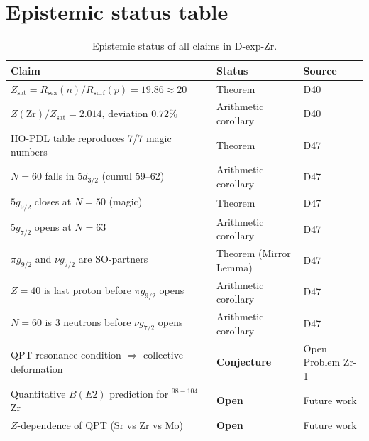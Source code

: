 \documentclass[11pt,a4paper]{article}
\theoremstyle{definition}
\theoremstyle{remark}
\newcommand{\Rsurf}{R_{\mathrm{surf}}}
\newcommand{\Rsea}{R_{\mathrm{sea}}}
\newcommand{\Zsat}{Z_{\mathrm{sat}}}
\begin{document}
\section{Epistemic status table}
\label{app:epistemic}

\begin{table}[H]
\centering
\caption{Epistemic status of all claims in D-exp-Zr.}
\label{tab:epistemic}
\small
\begin{tabular}{p{8cm}p{4cm}p{2cm}}
\toprule
Claim & Status & Source \\
\midrule
$\Zsat = \Rsea(n)/\Rsurf(p) = 19.86 \approx 20$ & Theorem & D40 \\
$Z(\mathrm{Zr})/\Zsat = 2.014$, deviation $0.72\%$ & Arithmetic corollary & D40 \\
HO-PDL table reproduces 7/7 magic numbers & Theorem & D47 \\
$N=60$ falls in $5d_{3/2}$ (cumul 59--62) & Arithmetic corollary & D47 \\
$5g_{9/2}$ closes at $N=50$ (magic) & Theorem & D47 \\
$5g_{7/2}$ opens at $N=63$ & Arithmetic corollary & D47 \\
$\pi g_{9/2}$ and $\nu g_{7/2}$ are SO-partners & Theorem (Mirror Lemma) & D47 \\
$Z=40$ is last proton before $\pi g_{9/2}$ opens & Arithmetic corollary & D47 \\
$N=60$ is 3 neutrons before $\nu g_{7/2}$ opens & Arithmetic corollary & D47 \\
\midrule
QPT resonance condition $\Rightarrow$ collective deformation & \textbf{Conjecture} & Open Problem Zr-1 \\
Quantitative $B(E2)$ prediction for $^{98-104}$Zr & \textbf{Open} & Future work \\
$Z$-dependence of QPT (Sr vs Zr vs Mo) & \textbf{Open} & Future work \\
\bottomrule
\end{tabular}
\end{table}



\end{document}
